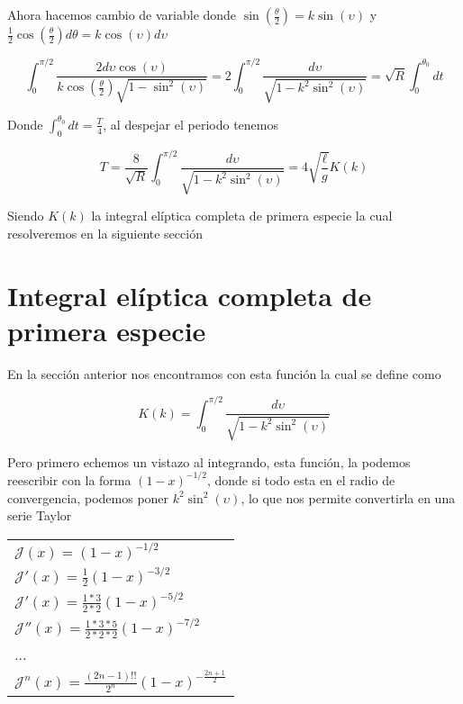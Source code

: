 \documentclass[]{article}
\begin{document}
	Ahora hacemos cambio de variable donde $\sin(\frac{\theta}{2}) = k\sin(\upsilon)$ y $\frac{1}{2}\cos(\frac{\theta}{2})d\theta = k\cos(\upsilon)d\upsilon$
	
	\begin{equation}
		\int^{\pi/2}_{0}\frac{2d\upsilon\cos(\upsilon)}{k\cos(\frac{\theta}{2})\sqrt{1-\sin^2\left(\upsilon\right)}} = 2\int^{\pi/2}_{0}\frac{d\upsilon}{\sqrt{1-k^2\sin^2(\upsilon)}} = \sqrt{R}\int^{\theta_0}_{0}dt
	\end{equation}
	
	Donde $\int^{\theta_0}_{0}dt = \frac{T}{4}$, al despejar el periodo tenemos
	
	\begin{equation}
		T = \frac{8}{\sqrt{R}}\int^{\pi/2}_{0}\frac{d\upsilon}{\sqrt{1-k^2\sin^2(\upsilon)}} = 4\sqrt{\frac{\ell}{g}}K(k)
	\end{equation}

	Siendo $K(k)$ la integral elíptica completa de primera especie la cual resolveremos en la siguiente sección
	
	\section{Integral elíptica completa de primera especie}
	
	En la sección anterior nos encontramos con esta función la cual se define como
	
	\begin{equation}
		K(k) = \int^{\pi/2}_{0}\frac{d\upsilon}{\sqrt{1-k^2\sin^2(\upsilon)}}
	\end{equation} 

	Pero primero echemos un vistazo al integrando, esta función, la podemos reescribir con la forma $(1-x)^{-1/2}$, donde si todo esta en el radio de convergencia, podemos poner $k^2\sin^2(\upsilon)$, lo que nos permite convertirla en una serie Taylor\\

	\begin{center}
		\begin{tabular}{l}
			$\mathcal{J}(x) = (1-x)^{-1/2}$\\[4pt]
			$\mathcal{J}'(x) = \frac{1}{2}(1-x)^{-3/2}$\\[4pt]
			$\mathcal{J}'(x) = \frac{1*3}{2*2}(1-x)^{-5/2}$\\[4pt]
			$\mathcal{J}''(x) = \frac{1*3*5}{2*2*2}(1-x)^{-7/2}$\\
			...\\
			$\mathcal{J}^n(x) = \frac{(2n-1)!!}{2^n}(1-x)^{-\frac{2n+1}{2}}$
		\end{tabular}
	\end{center}
\end{document}
